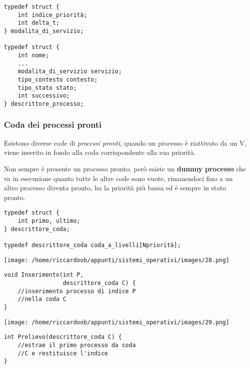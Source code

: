 \begin{verbatim}
typedef struct {
    int indice_priorità;
    int delta_t;
} modalita_di_servizio;

typedef struct {
    int nome;
    ...
    modalita_di_servizio servizio;
    tipo_contesto contesto;
    tipo_stato stato;
    int successivo;
} descrittore_processo;
\end{verbatim}

\subsubsection{Coda dei processi pronti}
Esistono diverse code di \textit{processi pronti}, quando un processo è riattivato da un V, viene inserito in fondo alla coda corrispondente alla sua priorità.

Non sempre è presente un processo pronto, però esiste un \textbf{dummy processo} che va in esecuzione quanto tutte le altre code sono vuote, rimanendoci fino a un altro processo diventa pronto, ha la priorità più bassa ed è sempre in stato pronto.

\begin{verbatim}
typedef struct {
    int primo, ultimo;
} descrittore_coda;

typedef descrittore_coda coda_a_livelli[Npriorità];
\end{verbatim}

\begin{multicols}{2}
\begin{multicolfigure}
    \centering
    \texttt{[image: /home/riccardoob/appunti/sistemi\_operativi/images/28.png]}
\end{multicolfigure}
\columnbreak
\begin{verbatim}
void Inserimento(int P,
                 descrittore_coda C) {
    //inserimento processo di indice P
    //nella coda C
}
\end{verbatim}
    
\end{multicols}
\begin{multicols}{2}
\begin{multicolfigure}
    \centering
    \texttt{[image: /home/riccardoob/appunti/sistemi\_operativi/images/29.png]}
\end{multicolfigure}
\columnbreak
\begin{verbatim}
int Prelievo(descrittore_coda C) {
    //estrae il primo processo da coda
    //C e restituisce l'indice
}
\end{verbatim} 
\end{multicols}

